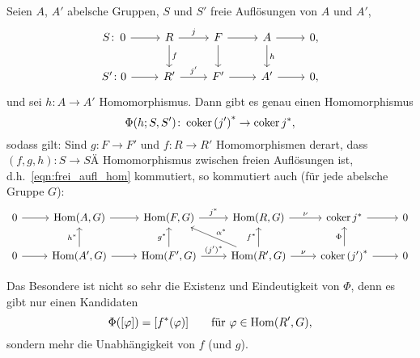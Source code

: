 \begin{prop}
  \label{thm:hom_freier_aufloesungen}
  Seien $A$, $A'$ abelsche Gruppen, $S$ und $S'$ freie Auflösungen von $A$ und $A'$,
  \begin{equation*}
    \begin{tikzcd}
      S\colon\,0 \arrow{r}{} & R   \arrow{d}{f}
                              \arrow{r}{j}  & F   \arrow{d}{}
                                                  \arrow{r}{}   & A   \arrow{d}{h}
                                                                      \arrow{r}{} & 0, \\
      S'\colon 0 \arrow{r}{} & R'  \arrow{r}{j'} & F'  \arrow{r}{}   & A'  \arrow{r}{} & 0,
    \end{tikzcd}
  \end{equation*}
  und sei $h\colon A \to A'$ Homomorphismus.
  Dann gibt es genau einen Homomorphismus
  \begin{equation*}
    \Phi(h;S,S') \colon \operatorname{coker} {(j')}^* \to \operatorname{coker} j^*,
  \end{equation*}
  sodass gilt: Sind $g \colon F \to F'$ und $f \colon R \to R'$ Homomorphismen derart, dass $(f,g,h) \colon S \to SÄ$ Homomorphismus zwischen freien Auflösungen ist, d.h.~\eqref{eqn:frei_aufl_hom} kommutiert, so kommutiert auch (für jede abelsche Gruppe $G$):
  \begin{equation*}
    \begin{tikzcd}
      0 \arrow{r}{}   & \Hom(A,G)   \arrow{r}{}   & \Hom(F,G) \arrow{r}{j^*}        & \Hom(R,G) \arrow{r}{\nu}  & \coker j^* \arrow{r}{}      & 0 \\
      0 \arrow{r}{}   & \Hom(A',G)  \arrow{u}{h^*}
                                    \arrow{r}{}   & \Hom(F',G)\arrow{u}{g^*}
                                                              \arrow{r}{{(j')}^*}  & \Hom(R',G) \arrow{u}{f^*}
                                                                                                \arrow[swap]{ul}{\alpha^*}
                                                                                                \arrow{r}{\nu} & \coker {(j')}^* \arrow{u}{\Phi}
                                                                                                                              \arrow{r}{} & 0
    \end{tikzcd}
  \end{equation*}
\end{prop}
\begin{kommentar}
  Das Besondere ist nicht so sehr die Existenz und Eindeutigkeit von $\Phi$, denn es gibt nur einen Kandidaten
  \begin{equation*}
    \Phi([\varphi]) = [f^*(\varphi)]  \qquad \text{für } \varphi \in \mathrm{Hom}(R',G),
  \end{equation*}
  sondern mehr die Unabhängigkeit von $f$ (und $g$).
\end{kommentar}
